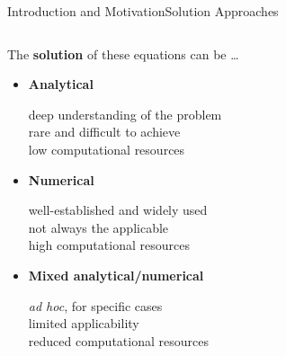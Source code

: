 \begin{frame}{Introduction and Motivation}{Solution Approaches}
  \begin{columns}
    \begin{column}[c]{0.45\textwidth}
      The \textbf{solution} of these equations can be \dots \\
      \begin{itemize}
        \item<1-> \textbf{Analytical} \\
        \begin{small}
          \qquad \textcolor{mycolor2!95!black}{deep understanding of the problem} \\
          \qquad \textcolor{mycolor2!95!black}{rare and difficult to achieve} \\
          \qquad \textcolor{mycolor5!95!black}{low computational resources}
        \end{small}
        \item<3-> \textbf{Numerical} \\
        \begin{small}
          \qquad \textcolor{mycolor5!95!black}{well-established and widely used} \\
          \qquad \textcolor{mycolor3!95!black}{not always the applicable} \\
          \qquad \textcolor{mycolor2!95!black}{high computational resources}
        \end{small}
        \item<5-> \textbf{Mixed analytical/numerical} \\
        \begin{small}
          \qquad \textcolor{mycolor3!95!black}{\emph{ad hoc}, for specific cases} \\
          \qquad \textcolor{mycolor3!95!black}{limited applicability} \\
          \qquad \textcolor{mycolor3!95!black}{reduced computational resources}
        \end{small}
      \end{itemize}
    \end{column}
    \begin{column}[c]{0.6\textwidth}
      \centering
      \small
      \vspace{-2.0em}

\end{column}
\end{columns}
\end{frame}
